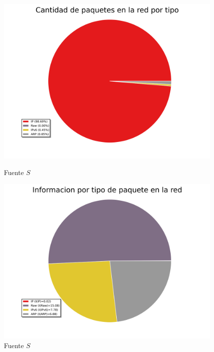 \begin{figure}[ht!]
  \centering
  \begin{minipage}[b]{0.48\textwidth}
    \includegraphics[width=\textwidth]{graficos/red_domestica_pie_type.png}
    \caption{Fuente $S$}
    \label{fig:red_domestica_pie_type}
  \end{minipage}
  \hfill
  \begin{minipage}[b]{0.48\textwidth}
    \includegraphics[width=\textwidth]{graficos/red_domestica_pie_type_information.png}
    \caption{Fuente $S$}
    \label{fig:red_domestica_pie_type_information}
  \end{minipage}
\end{figure}

